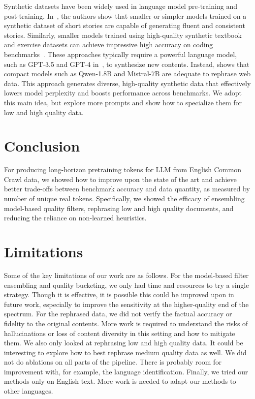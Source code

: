 \documentclass[11pt]{article}
\begin{document}
Synthetic datasets have been widely used in language model pre-training and post-training.
In~\citep{eldan2023tinystories}, the authors show that smaller or simpler models trained on a synthetic dataset of short stories are capable of generating fluent and consistent stories. Similarly, smaller models trained using high-quality synthetic textbook and exercise datasets can achieve impressive high accuracy on coding benchmarks~\citep{gunasekar2023textbooks,li2023textbooks}.
These approaches typically require a powerful language model, such as GPT-3.5 and GPT-4 in~\citep{eldan2023tinystories}, to synthesize new contents.
Instead, \citep{maini2024rephrasing} shows that compact models such as Qwen-1.8B and Mistral-7B are adequate to rephrase web data. This approach generates diverse, high-quality synthetic data that effectively lowers model perplexity and boosts performance across benchmarks.
We adopt this main idea, but explore more prompts and show how to specialize them for low and high quality data.


\section{Conclusion}

For producing long-horizon pretraining tokens for LLM from English Common Crawl data, we showed how to improve upon the state of the art and achieve better trade-offs between benchmark accuracy and data quantity, as measured by number of unique real tokens. Specifically, we showed the efficacy of ensembling model-based quality filters, rephrasing low and high quality documents, and reducing the reliance on non-learned heuristics.

\section{Limitations}

Some of the key limitations of our work are as follows. For the model-based filter ensembling and quality bucketing, we only had time and resources to try a single strategy. Though it is effective, it is possible this could be improved upon in future work, especially to improve the sensitivity at the higher-quality end of the spectrum. For the rephrased data, we did not verify the factual accuracy or fidelity to the original contents. More work is required to understand the risks of hallucinations or loss of content diversity in this setting and how to mitigate them. We also only looked at rephrasing low and high quality data. It could be interesting to explore how to best rephrase medium quality data as well. We did not do ablations on all parts of the pipeline. There is probably room for improvement with, for example, the language identification. Finally, we tried our methods only on English text. More work is needed to adapt our methods to other languages.
\end{document}
